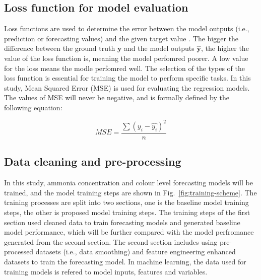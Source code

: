 \subsection{Loss function for model evaluation}
Loss functions are used to determine the error between the model outputs (i.e., prediction or forecasting values) and the given target value \citep{deepaiLossFunction2022}. The bigger the difference between the ground truth $\bm{y}$ and the model outputs $\bm{\hat{y}}$, the higher the value of the loss function is, meaning the model perfomred poorer. A low value for the loss means the modle perfomred well. The selection of the types of the loss function is essential for training the model to perform specific tasks. In this study, Mean Squared Error (MSE) is used for evaluating the regression models. The values of MSE will never be negative, and is formally defined by the following equation:

\begin{equation}\label{eq-mse}
    MSE=\frac{\sum (y_i-\hat{y_i})^2}{n}
\end{equation}

\subsection{Data cleaning and pre-processing}
In this study, ammonia concentration and colour level forecasting models will be trained, and the model training steps are shown in Fig.~\ref{fig:training-scheme}. The training processes are split into two sections, one is the baseline model training steps, the other is proposed model training steps. The training steps of the first section used cleaned data to train forecasting models and generated baseline model performance, which will be further compared with the model perfromance generated from the second section. The second section includes using pre-processed datasets (i.e., data smoothing) and feature engineering enhanced datasets to train the forecasting model. In machine learning, the data used for training models is refered to model inputs, features and variables.

